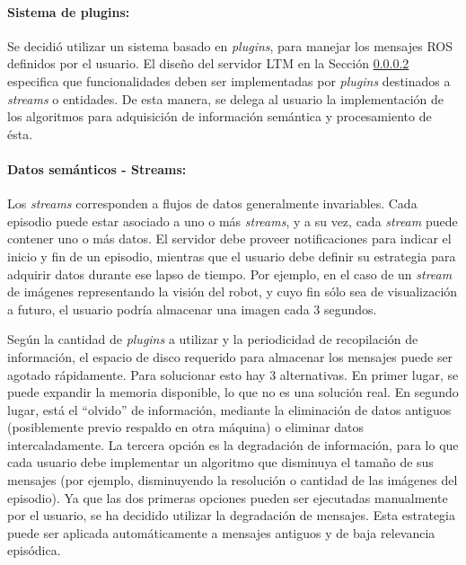 

\paragraph{Sistema de plugins:}
Se decidió utilizar un sistema basado en \textit{plugins}, para manejar los mensajes ROS definidos por el usuario. El diseño del servidor LTM en la Sección \ref{} especifica que funcionalidades deben ser implementadas por \textit{plugins} destinados a \textit{streams} o entidades. De esta manera, se delega al usuario la implementación de los algoritmos para adquisición de información semántica y procesamiento de ésta.


\paragraph{Datos semánticos - Streams:}
Los \textit{streams} corresponden a flujos de datos generalmente invariables. Cada episodio puede estar asociado a uno o más \textit{streams}, y a su vez, cada \textit{stream} puede contener uno o más datos. El servidor debe proveer notificaciones para indicar el inicio y fin de un episodio, mientras que el usuario debe definir su estrategia para adquirir datos durante ese lapso de tiempo. Por ejemplo, en el caso de un \textit{stream} de imágenes representando la visión del robot, y cuyo fin sólo sea de visualización a futuro, el usuario podría almacenar una imagen cada 3 segundos. 

Según la cantidad de \textit{plugins} a utilizar y la periodicidad de recopilación de información, el espacio de disco requerido para almacenar los mensajes puede ser agotado rápidamente. Para solucionar esto hay 3 alternativas. En primer lugar, se puede expandir la memoria disponible, lo que no es una solución real. En segundo lugar, está el ``olvido'' de información, mediante la eliminación de datos antiguos (posiblemente previo respaldo en otra máquina) o eliminar datos intercaladamente. La tercera opción es la degradación de información, para lo que cada usuario debe implementar un algoritmo que disminuya el tamaño de sus mensajes (por ejemplo, disminuyendo la resolución o cantidad de las imágenes del episodio). Ya que las dos primeras opciones pueden ser ejecutadas manualmente por el usuario, se ha decidido utilizar la degradación de mensajes. Esta estrategia puede ser aplicada automáticamente a mensajes antiguos y de baja relevancia episódica.

